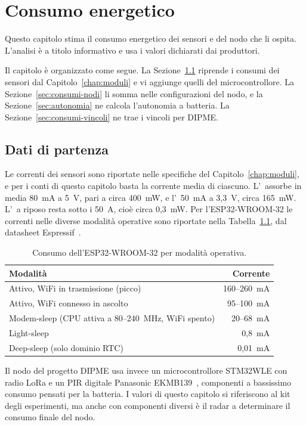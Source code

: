 \chapter{Consumo energetico}
\label{chap:consumi}

Questo capitolo stima il consumo energetico dei sensori e del nodo che li ospita. L'analisi è a titolo informativo e usa i valori dichiarati dai produttori.

Il capitolo è organizzato come segue. La Sezione~\ref{sec:consumi-dati} riprende i consumi dei sensori dal Capitolo~\ref{chap:moduli} e vi aggiunge quelli del microcontrollore. La Sezione~\ref{sec:consumi-nodi} li somma nelle configurazioni del nodo, e la Sezione~\ref{sec:autonomia} ne calcola l'autonomia a batteria. La Sezione~\ref{sec:consumi-vincoli} ne trae i vincoli per DIPME.

\section{Dati di partenza}
\label{sec:consumi-dati}

Le correnti dei sensori sono riportate nelle specifiche del Capitolo~\ref{chap:moduli}, e per i conti di questo capitolo basta la corrente media di ciascuno. L'\ldb\ assorbe in media 80~mA a 5~V, pari a circa 400~mW, e l'\ldc\ 50~mA a 3,3~V, circa 165~mW. L'\pir\ a riposo resta sotto i 50~\textmu A, cioè circa 0,3~mW. Per l'ESP32-WROOM-32 le correnti nelle diverse modalità operative sono riportate nella Tabella~\ref{tab:consumi-esp32}, dal datasheet Espressif~\cite{esp32datasheet}.

\begin{table}[htbp]
\centering
\caption{Consumo dell'ESP32-WROOM-32 per modalità operativa.}
\label{tab:consumi-esp32}
\small
\begin{tabular}{@{}lr@{}}
\toprule
\textbf{Modalità} & \textbf{Corrente} \\
\midrule
Attivo, WiFi in trasmissione (picco) & 160--260~mA \\
Attivo, WiFi connesso in ascolto & 95--100~mA \\
Modem-sleep (CPU attiva a 80--240~MHz, WiFi spento) & 20--68~mA \\
Light-sleep & 0,8~mA \\
Deep-sleep (solo dominio RTC) & 0,01~mA \\
\bottomrule
\end{tabular}
\end{table}

Il nodo del progetto DIPME usa invece un microcontrollore STM32WLE con radio LoRa e un PIR digitale Panasonic EKMB139~\cite{callisto2026dipme}, componenti a bassissimo consumo pensati per la batteria. I valori di questo capitolo si riferiscono al kit degli esperimenti, ma anche con componenti diversi è il radar a determinare il consumo finale del nodo.

